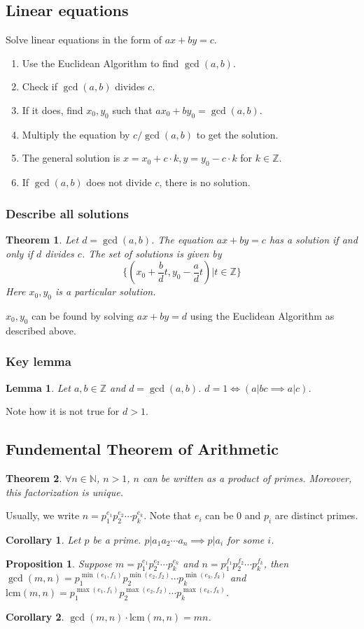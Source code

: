\documentclass[letterpaper,12pt,oneside]{article}
\newtheorem{theorem}{Theorem}
\newtheorem*{corollary}{Corollary}
\newtheorem*{lemma}{Lemma}
\newtheorem*{proposition}{Proposition}
\begin{document}
\subsection{Linear equations}
Solve linear equations in the form of $ax+by=c$.

\begin{enumerate}
    \item Use the Euclidean Algorithm to find $\gcd(a,b)$.
    \item Check if $\gcd(a,b)$ divides $c$.
    \item If it does, find $x_0, y_0$ such that $ax_0+by_0=\gcd(a,b)$.
    \item Multiply the equation by $c/\gcd(a,b)$ to get the solution.
    \item The general solution is $x=x_0+c\cdot k, y=y_0-c\cdot k$ for $k\in \mathbb{Z}$.
    \item If $\gcd(a,b)$ does not divide $c$, there is no solution.
\end{enumerate}
\subsubsection{Describe all solutions}
\begin{theorem}
    Let $d=\gcd(a,b)$. The equation $ax+by=c$ has a solution if and only if $d$ divides $c$. The set of solutions is given by\[
        \{(x_0+\frac{b}{d}t,y_0-\frac{a}{d}t)|t\in\mathbb{Z}\}
    \]
    Here $x_0,y_0$ is a particular solution.
\end{theorem}
$x_0,y_0$ can be found by solving $ax+by=d$ using the Euclidean Algorithm as described above.
\subsubsection{Key lemma}
\begin{lemma}
    Let $a,b\in \mathbb{Z}$ and $d=\gcd(a,b)$. $d=1 \iff (a|bc \implies a|c)$.
\end{lemma}
Note how it is not true for $d>1$.
\subsection{Fundemental Theorem of Arithmetic}
\begin{theorem}
    $\forall n\in \mathbb{N}$, $n>1$, $n$ can be written as a product of primes. Moreover, this factorization is unique.
\end{theorem}
Usually, we write $n=p_1^{e_1}p_2^{e_2}\cdots p_k^{e_k}$. Note that $e_i$ can be 0 and $p_i$ are distinct primes.
\begin{corollary}
    Let $p$ be a prime. $p|a_1a_2\cdots a_n \implies p|a_i$ for some $i$.
\end{corollary}
\begin{proposition}
    Suppose $m = p_1^{e_1}p_2^{e_2}\cdots p_k^{e_k}$ and $n = p_1^{f_1}p_2^{f_2}\cdots p_k^{f_k}$, then $\gcd(m,n) = p_1^{\min(e_1,f_1)}p_2^{\min(e_2,f_2)}\cdots p_k^{\min(e_k,f_k)}$ and $\text{lcm}(m,n) = p_1^{\max(e_1,f_1)}p_2^{\max(e_2,f_2)}\cdots p_k^{\max(e_k,f_k)}$.
\end{proposition}
\begin{corollary}
    $\gcd(m,n)\cdot \text{lcm}(m,n) = mn$.
\end{corollary}
\end{document}
